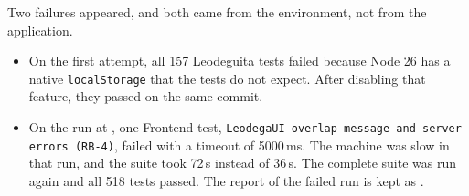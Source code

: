 Two failures appeared, and both came from the environment, not from the application.
\begin{itemize}
  \item On the first attempt, all 157 Leodeguita tests failed because Node 26 has a native \texttt{localStorage} that the tests do not expect.
  After disabling that feature, they passed on the same commit.
  \item On the run at , one Frontend test, \texttt{LeodegaUI overlap message and server errors (RB-4)}, failed with a timeout of 5000\,ms.
  The machine was slow in that run, and the suite took 72\,s instead of 36\,s.
  The complete suite was run again and all 518 tests passed.
  The report of the failed run is kept as .
\end{itemize}
